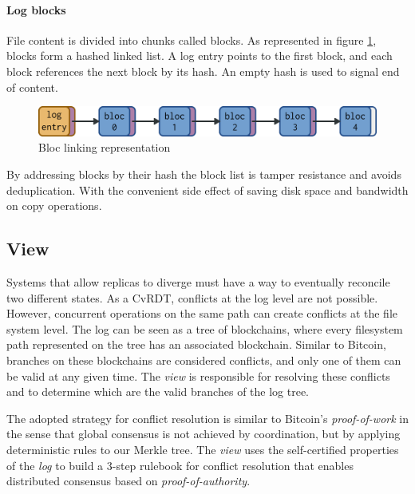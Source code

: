 \documentclass{sig-alternate}
\begin{document}
\paragraph{Log blocks}

File content is divided into chunks called blocks. As represented in figure \ref{fig:blocs}, blocks form a hashed linked list. A log entry points to the first block, and each block references the next block by its hash. An empty hash is used to signal end of content.

\begin{figure}
\centering
\includegraphics[width=\columnwidth]{imgs/blocs.png}
\caption{Bloc linking representation}
\label{fig:blocs}
\end{figure}

By addressing blocks by their hash the block list is tamper resistance and avoids deduplication. With the convenient side effect of saving disk space and bandwidth on copy operations.

\subsection{View} \label{view}

Systems that allow replicas to diverge must have a way to eventually reconcile two different states. As a CvRDT, conflicts at the log level are not possible. However, concurrent operations on the same path can create conflicts at the file system level. The log can be seen as a tree of blockchains\cite{back2014enabling}, where every filesystem path represented on the tree has an associated blockchain. Similar to Bitcoin, branches on these blockchains are considered conflicts, and only one of them can be valid at any given time. The \textit{view} is responsible for resolving these conflicts and to determine which are the valid branches of the log tree.

The adopted strategy for conflict resolution is similar to Bitcoin's \textit{proof-of-work}\cite{nakamoto2008bitcoin} in the sense that global consensus is not achieved by coordination, but by applying deterministic rules to our Merkle tree. The \textit{view} uses the self-certified properties of the \textit{log} to build a 3-step rulebook for conflict resolution that enables distributed consensus based on \textit{proof-of-authority}.
\end{document}
